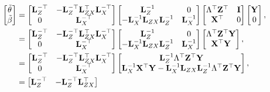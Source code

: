\documentclass[10pt]{article}
\begin{document}
\begin{align*}
\begin{bmatrix} \tilde{\theta} \\ \tilde{\beta} \end{bmatrix} & =
\begin{bmatrix}
{\bf L}_Z^{-\top} & -{\bf L}_Z^{-\top}{\bf L}_{ZX}^\top{\bf
  L}_X^{-\top} \\
0 & {\bf L}_X^{-\top}
\end{bmatrix}
\begin{bmatrix} {\bf L}_Z^{-1} & 0 \\ - {\bf L}_X^{-1} {\bf L}_{ZX}{\bf L}_Z^{-1} & {\bf
    L}_{X}^{-1} \end{bmatrix}
\begin{bmatrix} \Lambda^\top {\bf Z}^\top & {\bf I} \\ {\bf X}^\top & 0 \end{bmatrix}
\begin{bmatrix} {\bf Y} \\ 0 \end{bmatrix}, \\
%
& = \begin{bmatrix}
{\bf L}_Z^{-\top} & -{\bf L}_Z^{-\top}{\bf L}_{ZX}^\top{\bf
  L}_X^{-\top} \\
0 & {\bf L}_X^{-\top}
\end{bmatrix}
\begin{bmatrix} {\bf L}_Z^{-1} & 0 \\ - {\bf L}_X^{-1} {\bf L}_{ZX}{\bf L}_Z^{-1} & {\bf
    L}_{X}^{-1} \end{bmatrix}
\begin{bmatrix} \Lambda^\top{\bf Z}^\top{\bf Y} \\ {\bf X}^\top{\bf
    Y} \end{bmatrix}, \\
%
& = \begin{bmatrix}
{\bf L}_Z^{-\top} & -{\bf L}_Z^{-\top}{\bf L}_{ZX}^\top{\bf
  L}_X^{-\top} \\
0 & {\bf L}_X^{-\top}
\end{bmatrix}
\begin{bmatrix}
{\bf L}_Z^{-1}\Lambda^\top {\bf Z}^\top {\bf Y} \\
{\bf L}_X^{-1}{\bf X}^\top{\bf Y} -
{\bf L}_X^{-1}{\bf L}_{ZX}{\bf L}_Z^{-1}\Lambda^\top{\bf Z}^\top {\bf Y}
\end{bmatrix}, \\
%
& = \begin{bmatrix}
{\bf L}_Z^{-\top} & -{\bf L}_Z^{-\top}{\bf L}_{ZX}^\top{\bf
}
\end{bmatrix}
\end{align*}
\end{document}
